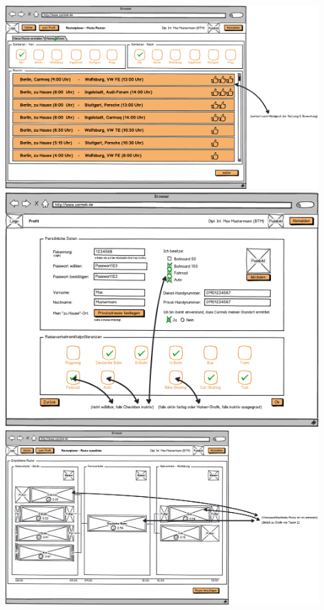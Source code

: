 \documentclass[12pt,a4paper]{article}
\begin{document}
\begin{center}
\includegraphics[width=12cm]{10_finaler_paperprototyp_005.png}\\
\includegraphics[width=12cm]{10_finaler_paperprototyp_006.png}\\
\includegraphics[width=12cm]{10_finaler_paperprototyp_007.png}\\
\end{center}

\newpage
\vspace*{40mm}
\end{document}
